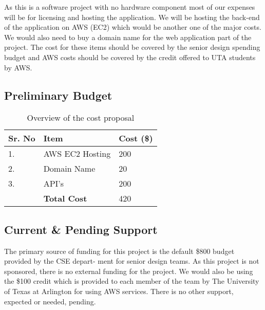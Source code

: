 As this is a software project with no hardware component most of our expenses will be for licensing and hosting the application. We will be hosting the back-end of the application on AWS (EC2) which would be another one of the major costs. We would also need to buy a domain name for the web application part of the project. The cost for these items should be covered by the senior design spending budget and AWS costs should be covered by the credit offered to UTA students by AWS. 
 

\subsection{Preliminary Budget}
\begin{table}[h]
\centering

\begin{tabular}{|l|l|l|} 
\hline
Sr. No & Item               & Cost (\$)  \\ 
\hline
1.     & AWS EC2 Hosting    & 200        \\ 
\hline
2.     & Domain Name        & 20         \\ 
\hline
3.     & API's              & 200        \\
\hline
 & \textbf{Total Cost}              & 420        \\
\hline
\end{tabular}\caption{Overview of the cost proposal}
\end{table}

\subsection{Current \& Pending Support}
The primary source of funding for this project is the default \$800 budget provided by the CSE depart-
ment for senior design teams. As this project is not sponsored, there is no external funding for the
project. We would also be using the \$100 credit which is provided to each member of the team by The University of Texas at Arlington for using AWS services. There is no other support, expected or needed, pending.